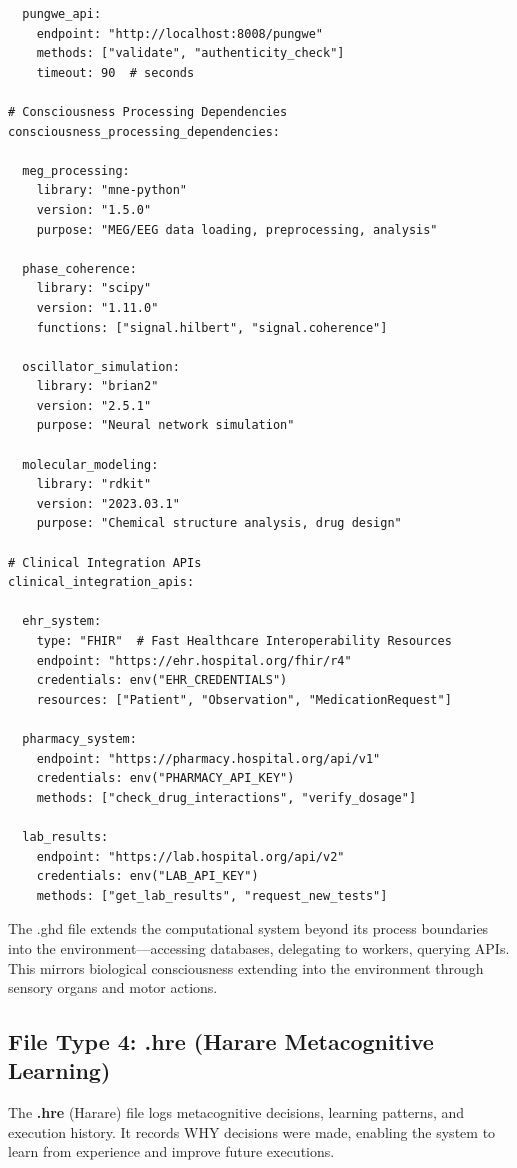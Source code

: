 \begin{verbatim}
  pungwe_api:
    endpoint: "http://localhost:8008/pungwe"
    methods: ["validate", "authenticity_check"]
    timeout: 90  # seconds

# Consciousness Processing Dependencies
consciousness_processing_dependencies:
  
  meg_processing:
    library: "mne-python"
    version: "1.5.0"
    purpose: "MEG/EEG data loading, preprocessing, analysis"
  
  phase_coherence:
    library: "scipy"
    version: "1.11.0"
    functions: ["signal.hilbert", "signal.coherence"]
  
  oscillator_simulation:
    library: "brian2"
    version: "2.5.1"
    purpose: "Neural network simulation"
  
  molecular_modeling:
    library: "rdkit"
    version: "2023.03.1"
    purpose: "Chemical structure analysis, drug design"

# Clinical Integration APIs
clinical_integration_apis:
  
  ehr_system:
    type: "FHIR"  # Fast Healthcare Interoperability Resources
    endpoint: "https://ehr.hospital.org/fhir/r4"
    credentials: env("EHR_CREDENTIALS")
    resources: ["Patient", "Observation", "MedicationRequest"]
  
  pharmacy_system:
    endpoint: "https://pharmacy.hospital.org/api/v1"
    credentials: env("PHARMACY_API_KEY")
    methods: ["check_drug_interactions", "verify_dosage"]
  
  lab_results:
    endpoint: "https://lab.hospital.org/api/v2"
    credentials: env("LAB_API_KEY")
    methods: ["get_lab_results", "request_new_tests"]
\end{verbatim}

\begin{proposition}
The .ghd file extends the computational system beyond its process boundaries into the environment—accessing databases, delegating to workers, querying APIs. This mirrors biological consciousness extending into the environment through sensory organs and motor actions.
\end{proposition}

\subsection{File Type 4: .hre (Harare Metacognitive Learning)}

\begin{definition}
The \textbf{.hre} (Harare) file logs metacognitive decisions, learning patterns, and execution history. It records WHY decisions were made, enabling the system to learn from experience and improve future executions.
\end{definition}

